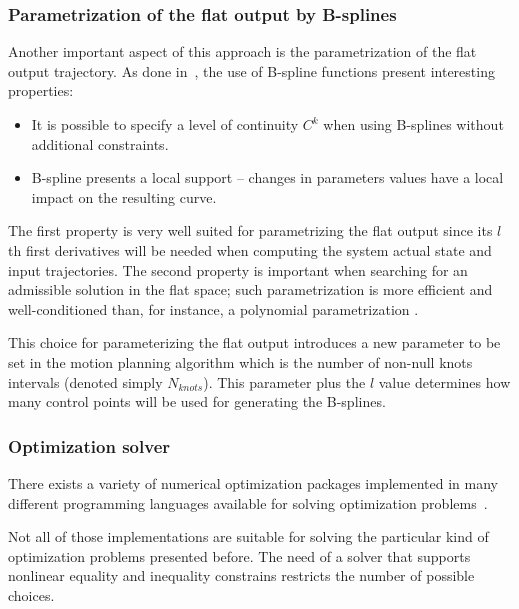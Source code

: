 \documentclass[eprint]{actapoly}
\begin{document}
\subsubsection{Parametrization of the flat output by B-splines}

Another important aspect of this approach is the parametrization of 
the flat output trajectory. As done in~\cite{Milam2003}, the use
of B-spline functions present interesting properties:


\begin{itemize}


 \item It is possible to specify a level of continuity $C^k$ when using
 B-splines without additional constraints.
 
 \item B-spline presents a local support -- changes in parameters values have a 
 local impact on the resulting curve.
 
 
\end{itemize}

The first property is very well suited for parametrizing the flat output since
its $l$th first derivatives will be needed when computing the system actual state
and input trajectories. The second property is important when searching for an
admissible solution in the flat space; such parametrization is more efficient
and well-conditioned than, for instance, a polynomial parametrization \cite{Milam2003}.


This choice for parameterizing the flat output introduces a new parameter to be set in
the motion planning algorithm which is the number of non-null knots intervals 
(denoted simply $N_{knots}$). This parameter plus the $l$ value determines how many 
control points will be used for generating the B-splines.

\subsubsection{Optimization solver}

There exists a variety of numerical optimization packages implemented in many different programming languages available for solving optimization problems~\cite{pyopt-paper}.

Not all of those implementations are suitable for solving
the particular kind of optimization problems presented before.
The need of a solver that supports nonlinear equality and inequality constrains
restricts the number of possible choices.
\end{document}
